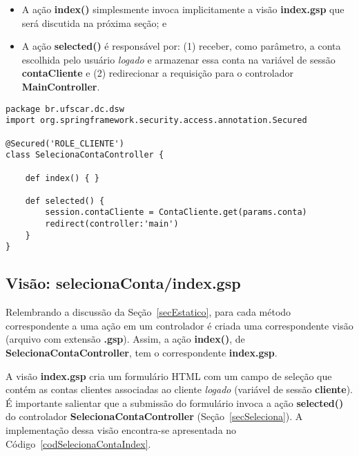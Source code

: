 \vspace{0.2cm}

\begin{itemize}

\item  A ação  {\bf index()}  simplesmente  invoca implicitamente  a visão  {\bf
  index.gsp} que será discutida na próxima seção; e

\vspace{0.2cm}

\item A ação {\bf selected()} é  responsável por: (1) receber, como parâmetro, a
  conta escolhida pelo  usuário {\it logado} e armazenar  essa conta na variável
  de  sessão  {\bf  contaCliente}  e   (2)  redirecionar  a  requisição  para  o
  controlador {\bf MainController}. 

\end{itemize}

\begin{lstlisting}[caption=Controlador      {\bf      SelecionaContaController},
    frame=trBL, float=htbp, label=codSelecionaContaController] 
package br.ufscar.dc.dsw 
import org.springframework.security.access.annotation.Secured

@Secured('ROLE_CLIENTE')
class SelecionaContaController {

    def index() { }
    
    def selected() {        
        session.contaCliente = ContaCliente.get(params.conta)
        redirect(controller:'main')
    }
}
\end{lstlisting}

\subsection{Visão: selecionaConta/index.gsp}

\vspace{0.5cm}

Relembrando   a   discussão  da   Seção~\ref{secEstatico},   para  cada   método
correspondente a  uma ação em um  controlador é criada  uma correspondente visão
(arquivo  com  extensão {\bf  .gsp}).   Assim, a  ação  {\bf  index()}, de  {\bf
  SelecionaContaController}, tem o correspondente {\bf index.gsp}.  

A visão  {\bf index.gsp}  cria um formulário  HTML com  um campo de  seleção que
contém as contas clientes associadas ao cliente {\it logado} (variável de sessão
{\bf cliente}).  É  importante salientar que a submissão  do formulário invoca a
ação   {\bf   selected()}    do   controlador   {\bf   SelecionaContaController}
(Seção~\ref{secSeleciona}). A implementação  dessa visão encontra-se apresentada
no Código~\ref{codSelecionaContaIndex}.  

